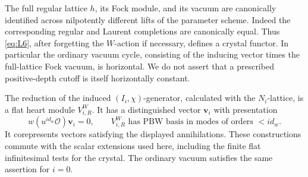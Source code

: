 The full regular lattice \(h\), its Fock module, and its vacuum are
canonically identified across nilpotently different lifts of the
parameter scheme.  Indeed the corresponding regular and Laurent
completions are canonically equal.  Thus \eqref{eq:L6}, after forgetting
the \(W\)-action if necessary, defines a crystal functor.  In
particular the ordinary vacuum cycle, consisting of the inducing
vector times the full-lattice Fock vacuum, is horizontal.  We do not
assert that a prescribed positive-depth cutoff is itself horizontally
constant.

\begin{lemma}\label{walg:vacua}
The reduction of the induced \((I_i,\chi)\)-generator, calculated
with the \(N_i\)-lattice, is a flat heart module \(V_{i,R}^W\).
It has a distinguished vector \(\mathbf v_i\) with presentation
\begin{equation}\label{eq:L7}
 w(u^{i d_w}\mathcal O)\mathbf v_i=0,
 \qquad
 V_{i,R}^W\text{ has PBW basis in modes of orders }<i d_w.
\end{equation}
It corepresents vectors satisfying the displayed annihilations.
These constructions commute with the scalar extensions used here,
including the finite flat infinitesimal tests for the crystal.
The ordinary vacuum satisfies the same assertion for \(i=0\).
\end{lemma}

